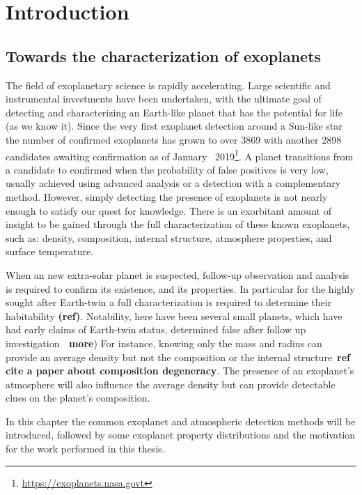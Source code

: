 
\chapter{Introduction}\label{cha:introduction}

\section{Towards the characterization of exoplanets}

The field of exoplanetary science is rapidly accelerating. Large scientific and instrumental investments have been undertaken, with the ultimate goal of detecting and characterizing an Earth-like planet that has the potential for life (as we know it).
Since the very first exoplanet detection around a Sun-like star~\citep{mayor_jupitermass_1995} the number of confirmed exoplanets has grown to over 3869 with another 2898 candidates awaiting confirmation as of January~ 2019\footnote{\href{https://exoplanets.nasa.gov/}{https://exoplanets.nasa.govt}}. A planet transitions from a candidate to confirmed when the probability of false positives is very low, usually achieved using advanced analysis or a detection with a complementary method.
However, simply detecting the presence of exoplanets is not nearly enough to satisfy our quest for knowledge.
There is an exorbitant amount of insight to be gained through the full characterization of these known exoplanets, such as: density, composition, internal structure, atmosphere properties, and surface temperature.

When an new extra-solar planet is suspected, follow-up observation and analysis is required to confirm its existence, and its properties.
In particular for the highly sought after Earth-twin a full characterization is required to determine their habitability \textbf{(ref)}.\todo{}
Notability, here have been several small planets, which have had early claims of Earth-twin status, determined false after follow up investigation\textbf{~\citep[e.g.][]{mullally_kepler_2018} \textbf{more}})
For instance, knowing only the mass and radius can provide an average density but not the composition or the internal structure~\textbf{ref cite {a paper about composition degeneracy}}. \todo{}
The presence of an exoplanet's atmosphere will also influence the average density but can provide detectable clues on the planet's composition.

In this chapter the common exoplanet and atmospheric detection methods will be introduced, followed by some exoplanet property distributions and the motivation for the work performed in this thesis.\\












